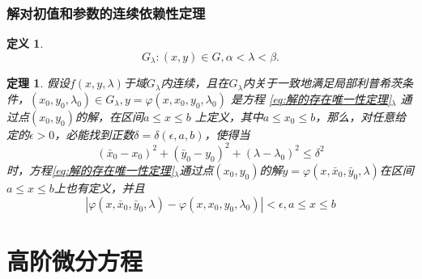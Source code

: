 \documentclass{ctexart}
\newtheorem{definition}{定义}[section]
\newtheorem{theorem}{定理}[section]
\numberwithin{equation}{subsection}
\begin{document}
\subsubsection{解对初值和参数的连续依赖性定理}
\begin{definition}
        \[ G_\lambda : (x,y) \in G, \alpha < \lambda < \beta .\]
\end{definition}
\begin{theorem}
        假设$f(x,y,\lambda)$于域$G_\lambda$内连续，且在$G_\lambda$内关于一致地满足局部利普希茨条件，$(x_0,y_0,\lambda_0) \in G_\lambda,y = \varphi (x,x_0,y_0,\lambda_0)$ 是方程 \eqref{eq:解的存在唯一性定理}$_\lambda$ 通过点$(x_0,y_0)$的解，在区间$a \le x \le b$ 上定义，其中$a \le x_0 \le b$，那么，对任意给定的$\epsilon >0$，必能找到正数$\delta=\delta(\epsilon,a,b)$，使得当\[
            (\bar{x}_0-x_0)^2+(\bar{y}_0-y_0)^2 +(\lambda-\lambda_0)^2 \le \delta^2    
        \]时，方程\eqref{eq:解的存在唯一性定理}$_\lambda$通过点$(x_0,y_0)$的解$y=\varphi(x,\bar{x}_0,\bar{y}_0,\lambda)$在区间$a \le x \le b$上也有定义，并且\[|\varphi(x,\bar{x}_0,\bar{y}_0,\lambda)-\varphi(x,x_0,y_0,\lambda_0)|<\epsilon,a \le x \le b \]
\end{theorem}
\section{高阶微分方程}
\end{document}
